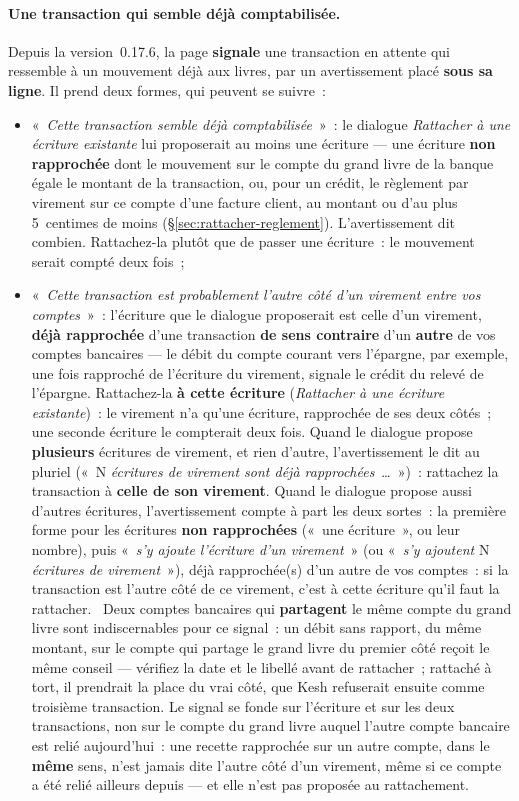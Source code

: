 \documentclass[a4paper,11pt,oneside]{article}
\begin{document}
\paragraph{Une transaction qui semble déjà comptabilisée.}\label{sec:deja-comptabilisee} Depuis la version~0.17.6, la page \textbf{signale} une transaction en attente qui ressemble à un mouvement déjà aux livres, par un avertissement placé \textbf{sous sa ligne}. Il prend deux formes, qui peuvent se suivre~:
\begin{itemize}
    \item «~\emph{Cette transaction semble déjà comptabilisée}~»~: le dialogue \emph{Rattacher à une écriture existante} lui proposerait au moins une écriture --- une écriture \textbf{non rapprochée} dont le mouvement sur le compte du grand livre de la banque égale le montant de la transaction, ou, pour un crédit, le règlement par virement sur ce compte d'une facture client, au montant ou d'au plus 5~centimes de moins (\S\ref{sec:rattacher-reglement}). L'avertissement dit combien. Rattachez-la plutôt que de passer une écriture~: le mouvement serait compté deux fois~;
    \item «~\emph{Cette transaction est probablement l'autre côté d'un virement entre vos comptes}~»~: l'écriture que le dialogue proposerait est celle d'un virement, \textbf{déjà rapprochée} d'une transaction \textbf{de sens contraire} d'un \textbf{autre} de vos comptes bancaires --- le débit du compte courant vers l'épargne, par exemple, une fois rapproché de l'écriture du virement, signale le crédit du relevé de l'épargne. Rattachez-la \textbf{à cette écriture} (\emph{Rattacher à une écriture existante})~: le virement n'a qu'une écriture, rapprochée de ses deux côtés~; une seconde écriture le compterait deux fois. Quand le dialogue propose \textbf{plusieurs} écritures de virement, et rien d'autre, l'avertissement le dit au pluriel («~N \emph{écritures de virement sont déjà rapprochées}~…~»)~: rattachez la transaction à \textbf{celle de son virement}. Quand le dialogue propose aussi d'autres écritures, l'avertissement compte à part les deux sortes~: la première forme pour les écritures \textbf{non rapprochées} («~une écriture~», ou leur nombre), puis «~\emph{s'y ajoute l'écriture d'un virement}~» (ou «~\emph{s'y ajoutent} N \emph{écritures de virement}~»), déjà rapprochée(s) d'un autre de vos comptes~: si la transaction est l'autre côté de ce virement, c'est à cette écriture qu'il faut la rattacher. \keshAttention\ Deux comptes bancaires qui \textbf{partagent} le même compte du grand livre sont indiscernables pour ce signal~: un débit sans rapport, du même montant, sur le compte qui partage le grand livre du premier côté reçoit le même conseil --- vérifiez la date et le libellé avant de rattacher~; rattaché à tort, il prendrait la place du vrai côté, que Kesh refuserait ensuite comme troisième transaction. Le signal se fonde sur l'écriture et sur les deux transactions, non sur le compte du grand livre auquel l'autre compte bancaire est relié aujourd'hui~: une recette rapprochée sur un autre compte, dans le \textbf{même} sens, n'est jamais dite l'autre côté d'un virement, même si ce compte a été relié ailleurs depuis --- et elle n'est pas proposée au rattachement.
\end{itemize}
\end{document}
